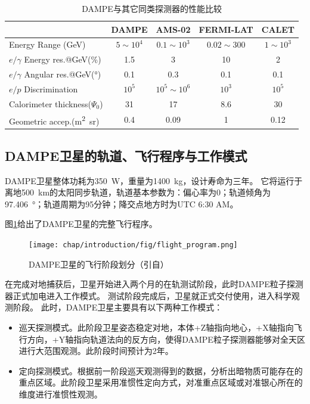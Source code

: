 \begin{table}[htb]
	\centering
	\caption{DAMPE与其它同类探测器的性能比较}
	\label{tab:introduction:dampe_comparison}
	\begin{threeparttable}
	\begin{tabulary}{\linewidth}{LCCCC}
		\toprule[1.5pt]
		  & DAMPE & AMS-02 & FERMI-LAT & CALET \\ 
		\midrule[1pt]
		Energy Range (\si{GeV}) & $5\sim10^4$ & $0.1\sim10^3$ & $0.02\sim300$ & $1\sim10^3$ \\ 
		$e/\gamma$ Energy res.@\si{GeV}(\si{\percent}) & 1.5 & 3 & 10 & 2 \\ 
		$e/\gamma$ Angular res.@\si{GeV}(\si{\degree}) & 0.1 & 0.3 & 0.1 & 0.1 \\ 
		$e/p$ Discrimination& $10^5$ & $10^5\sim10^6$ & $10^3$ & $10^5$ \\ 
		Calorimeter thickness($\Psi_0$) & 31 & 17 & 8.6 & 30 \\ 
		Geometric accep.(\si{\meter\squared\steradian}) & 0.4 & 0.09 & 1 & 0.12 \\ 
		\bottomrule[1.5pt] 
	\end{tabulary}
	\end{threeparttable}
\end{table}

\subsection{DAMPE卫星的轨道、飞行程序与工作模式}

DAMPE卫星整体功耗为\SI{350}{W}，重量为\SI{1400}{kg}，设计寿命为三年\parencite{psd_tdr}。
它将运行于离地\SI{500}{\kilo\meter}的太阳同步轨道，轨道基本参数为：偏心率为0；轨道倾角为\SI{97.406}{\degree}；轨道周期为95分钟；降交点地方时为UTC 6:30 AM。

图\ref{fig:introduction:flight_program}给出了DAMPE卫星的完整飞行程序。
\begin{figure}[htbp]
	\centering
	\texttt{[image: chap/introduction/fig/flight\_program.png]}
	\caption{DAMPE卫星的飞行阶段划分（引自\parencite{psd_tdr}）}
	\label{fig:introduction:flight_program}
\end{figure}
在完成对地捕获后，卫星开始进入两个月的在轨测试阶段，此时DAMPE粒子探测器正式加电进入工作模式。
测试阶段完成后，卫星就正式交付使用，进入科学观测阶段。
此时，DAMPE卫星主要具有以下两种工作模式：
\begin{itemize}
	\item 巡天探测模式。此阶段卫星姿态稳定对地，本体+Z轴指向地心，+X轴指向飞行方向，+Y轴指向轨道法向的反方向，使得DAMPE粒子探测器能够对全天区进行大范围观测。此阶段时间预计为2年。
	\item 定向探测模式。根据前一阶段巡天观测得到的数据，分析出暗物质可能存在的重点区域。此阶段卫星采用准惯性定向方式，对准重点区域或对准银心所在的维度进行准惯性观测。
\end{itemize}


